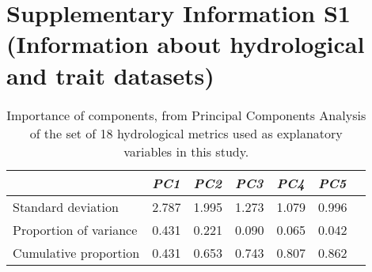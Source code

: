 \chapter[Supplementary Information S1 (Information about hydrological and trait datasets)]{Supplementary Information S1 (Information about hydrological and trait datasets)}

\begin{table}[ht]
\tiny
\centering
\caption[PCA of hydrological variables]{Importance of components, from Principal Components Analysis of the set of 18 hydrological metrics used as explanatory variables in this study.}
\label{Ch4sup_T1}
\begin{tabu} to 
\hline
                       &  \textit{PC1}   & \textit{PC2}   & \textit{PC3}   & \textit{PC4}   & \textit{PC5}  \\ \hline
Standard deviation     & 2.787 & 1.995 & 1.273 & 1.079 & 0.996 \\
Proportion of variance & 0.431 & 0.221 & 0.090 & 0.065 & 0.042 \\
Cumulative proportion  & 0.431 & 0.653 & 0.743 & 0.807 & 0.862 \\ \hline
\end{tabu}
\end{table}

